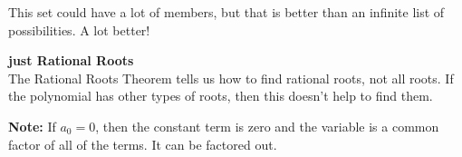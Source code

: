 \documentclass{ximera}
\begin{document}
This set could have a lot of members, but that is better than an infinite list of possibilities.  A lot better! \\


\begin{warning} \textbf{\textcolor{red!80!black}{just Rational Roots}} \\


The Rational Roots Theorem tells us how to find rational roots, not all roots.  If the polynomial has other types of roots, then this doesn't help to find them.


\end{warning}

\textbf{Note:} If $a_0 = 0$, then the constant term is zero and the variable is a common factor of all of the terms.  It can be factored out.
\end{document}
